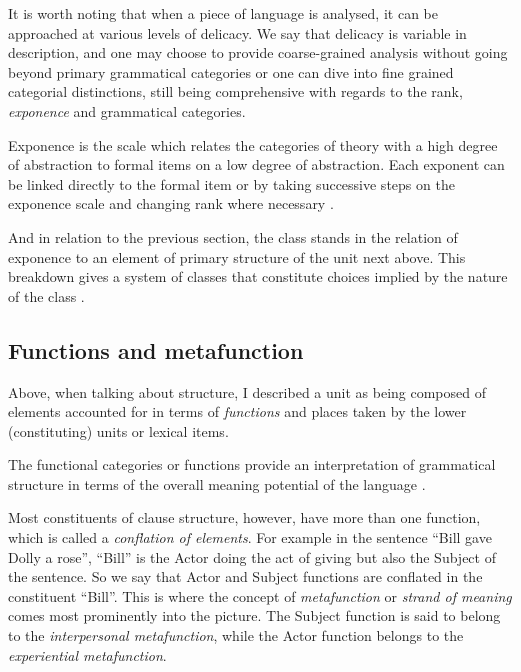 
It is worth noting that when a piece of language is analysed, it can be approached at various levels of delicacy. We say that delicacy is variable in description, and one may choose to provide coarse-grained analysis without going beyond primary grammatical categories or one can dive into fine grained categorial distinctions, still being comprehensive with regards to the rank, \textit{exponence} and grammatical categories. 

\begin{definition}[Exponence]\label{def:exponence-sydney}
    Exponence is the scale which relates the categories of theory with a high degree of abstraction to formal items on a low degree of abstraction. Each exponent can be linked directly to the formal item or by taking successive steps on the exponence scale and changing rank where necessary \citet[57]{Halliday2002}.
\end{definition}

And in relation to the previous section, the class stands in the relation of exponence to an element of primary structure of the unit next above. This breakdown gives a system of classes that constitute choices implied by the nature of the class \citep[41]{Halliday2002}. 

\subsection{Functions and metafunction}
\label{sec:functions-metafunctions}
Above, when talking about structure, I described a unit as being composed of elements accounted for in terms of \textit{functions} and places taken by the lower (constituting) units or lexical items.

\begin{definition}[Function]\label{def:function}
	The functional categories or functions provide an interpretation of grammatical structure in terms of the overall meaning potential of the language \citep[76]{Halliday2013}.
\end{definition}

Most constituents of clause structure, however, have more than one function, which is called a \textit{conflation of elements}. For example in the sentence ``Bill gave Dolly a rose'', ``Bill'' is the Actor doing the act of giving but also the Subject of the sentence. So we say that Actor and Subject functions are conflated in the constituent ``Bill''. This is where the concept of \textit{metafunction} or \textit{strand of meaning} comes most prominently into the picture. The Subject function is said to belong to the \textit{interpersonal metafunction}, while the Actor function belongs to the \textit{experiential metafunction}. 


